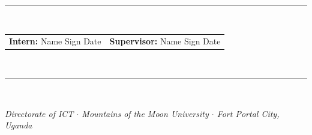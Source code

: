 \documentclass[a4paper,10pt]{article}
\begin{document}
\vspace{4pt}
\noindent\textcolor{navy}{\rule{\linewidth}{0.6pt}}\\[3pt]
\noindent
\begin{tabularx}{\linewidth}{@{}XX@{}}
  \textbf{Intern:} \quad Name \underline{\hspace{5.5cm}} \quad Sign \underline{\hspace{2.5cm}} \quad Date \underline{\hspace{2cm}} &
  \textbf{Supervisor:} \quad Name \underline{\hspace{5cm}} \quad Sign \underline{\hspace{2.5cm}} \quad Date \underline{\hspace{2cm}}
\end{tabularx}\\[3pt]
\noindent\textcolor{gold}{\rule{\linewidth}{1.5pt}}\\[1pt]
\begin{center}
{\footnotesize\color{navy}\itshape Directorate of ICT $\cdot$ Mountains of the Moon University $\cdot$ Fort Portal City, Uganda}
\end{center}
\end{document}
